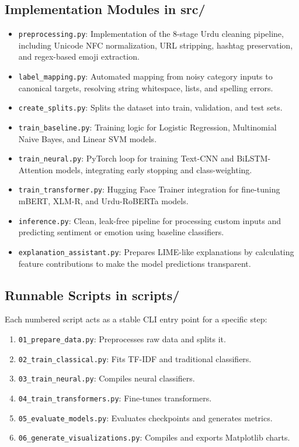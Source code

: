 \documentclass[conference]{IEEEtran}
\begin{document}
\subsection{Implementation Modules in src/}
\begin{itemize}[leftmargin=*]
    \item \texttt{preprocessing.py}: Implementation of the 8-stage Urdu cleaning pipeline, including Unicode NFC normalization, URL stripping, hashtag preservation, and regex-based emoji extraction.
    \item \texttt{label\_mapping.py}: Automated mapping from noisy category inputs to canonical targets, resolving string whitespace, lists, and spelling errors.
    \item \texttt{create\_splits.py}: Splits the dataset into train, validation, and test sets.
    \item \texttt{train\_baseline.py}: Training logic for Logistic Regression, Multinomial Naive Bayes, and Linear SVM models.
    \item \texttt{train\_neural.py}: PyTorch loop for training Text-CNN and BiLSTM-Attention models, integrating early stopping and class-weighting.
    \item \texttt{train\_transformer.py}: Hugging Face Trainer integration for fine-tuning mBERT, XLM-R, and Urdu-RoBERTa models.
    \item \texttt{inference.py}: Clean, leak-free pipeline for processing custom inputs and predicting sentiment or emotion using baseline classifiers.
    \item \texttt{explanation\_assistant.py}: Prepares LIME-like explanations by calculating feature contributions to make the model predictions transparent.
\end{itemize}

\subsection{Runnable Scripts in scripts/}
Each numbered script acts as a stable CLI entry point for a specific step:
\begin{enumerate}
    \item \texttt{01\_prepare\_data.py}: Preprocesses raw data and splits it.
    \item \texttt{02\_train\_classical.py}: Fits TF-IDF and traditional classifiers.
    \item \texttt{03\_train\_neural.py}: Compiles neural classifiers.
    \item \texttt{04\_train\_transformers.py}: Fine-tunes transformers.
    \item \texttt{05\_evaluate\_models.py}: Evaluates checkpoints and generates metrics.
    \item \texttt{06\_generate\_visualizations.py}: Compiles and exports Matplotlib charts.
\end{enumerate}
\end{document}
